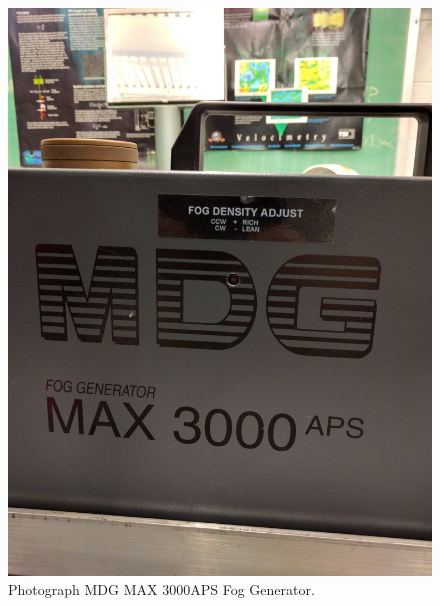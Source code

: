 \begin{figure}[H]
	\centering
	\includegraphics[width=5in]{figs/piv_method/fog_generator}
	\caption{Photograph MDG MAX 3000APS Fog Generator.}
	\label{fig:fog_machine}
\end{figure}


